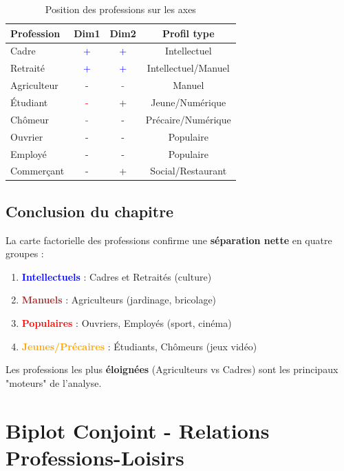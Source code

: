 \documentclass[12pt,a4paper]{book}
\begin{document}
	\begin{table}[H]
		\centering
		\caption{Position des professions sur les axes}
		\begin{tabular}{lccc}
			\toprule
			\textbf{Profession} & \textbf{Dim1} & \textbf{Dim2} & \textbf{Profil type} \\
			\midrule
			Cadre & \textcolor{blue}{+} & \textcolor{blue}{+} & Intellectuel \\
			Retraité & \textcolor{blue}{+} & \textcolor{blue}{+} & Intellectuel/Manuel \\
			Agriculteur & - & \textcolor{brown}{-} & Manuel \\
			Étudiant & \textcolor{red}{-} & + & Jeune/Numérique \\
			Chômeur & \textcolor{red}{-} & - & Précaire/Numérique \\
			Ouvrier & - & - & Populaire \\
			Employé & - & - & Populaire \\
			Commerçant & - & + & Social/Restaurant \\
			\bottomrule
		\end{tabular}
	\end{table}
	
	\section{Conclusion du chapitre}
	
	La carte factorielle des professions confirme une \textbf{séparation nette} en quatre groupes :
	
	\begin{enumerate}
		\item \textcolor{blue}{\textbf{Intellectuels}} : Cadres et Retraités (culture)
		\item \textcolor{brown}{\textbf{Manuels}} : Agriculteurs (jardinage, bricolage)
		\item \textcolor{red}{\textbf{Populaires}} : Ouvriers, Employés (sport, cinéma)
		\item \textcolor{orange}{\textbf{Jeunes/Précaires}} : Étudiants, Chômeurs (jeux vidéo)
	\end{enumerate}
	
	Les professions les plus \textbf{éloignées} (Agriculteurs vs Cadres) sont les principaux "moteurs" de l'analyse.
	
	\chapter{Biplot Conjoint - Relations Professions-Loisirs}
	
\end{document}
